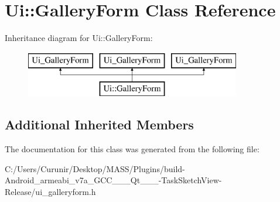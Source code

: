 \hypertarget{class_ui_1_1_gallery_form}{}\section{Ui\+:\+:Gallery\+Form Class Reference}
\label{class_ui_1_1_gallery_form}
Inheritance diagram for Ui\+:\+:Gallery\+Form\+:\begin{figure}[H]
\begin{center}
\leavevmode
\includegraphics[height=2.000000cm]{class_ui_1_1_gallery_form}
\end{center}
\end{figure}
\subsection*{Additional Inherited Members}


The documentation for this class was generated from the following file\+:\begin{DoxyCompactItemize}
\item 
C\+:/\+Users/\+Curunir/\+Desktop/\+M\+A\+S\+S/\+Plugins/build-\/\+Android\+\_\+armeabi\+\_\+v7a\+\_\+\+G\+C\+C\+\_\+\_\+\_\+\+Qt\+\_\+\_\+\_-\/\+Task\+Sketch\+View-\/\+Release/ui\+\_\+galleryform.\+h\end{DoxyCompactItemize}
